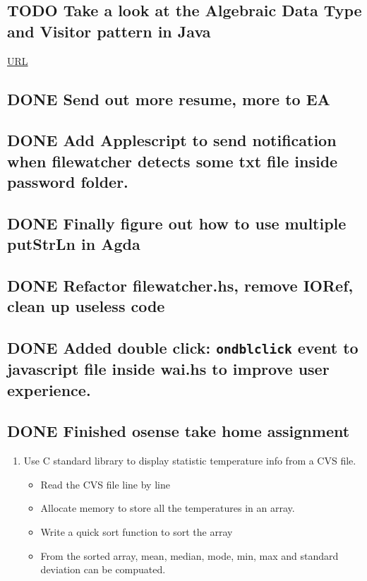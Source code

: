 \documentclass[11pt]{article}
\begin{document}
\subsection{{\bfseries\sffamily TODO} Take a look at the Algebraic Data Type and Visitor pattern in Java}
\label{sec:orgff86d82}
\href{https://www.ahnfelt.net/monads-forget-about-bind/}{URL}
\subsection{{\bfseries\sffamily DONE} Send out more resume,  more to EA}
\label{sec:org56aba22}





\subsection{{\bfseries\sffamily DONE} Add Applescript to send notification when filewatcher detects some txt file inside password folder.}
\label{sec:org25a4dff}
\subsection{{\bfseries\sffamily DONE} Finally figure out how to use multiple putStrLn in Agda}
\label{sec:org5621462}

\subsection{{\bfseries\sffamily DONE} Refactor filewatcher.hs, remove IORef, clean up useless code}
\label{sec:org15b4584}
\subsection{{\bfseries\sffamily DONE} Added double click: \texttt{ondblclick} event to javascript file inside wai.hs to improve user experience.}
\label{sec:org84a45ef}
\subsection{{\bfseries\sffamily DONE} Finished osense take home assignment}
\label{sec:org8151c1b}
\begin{enumerate}
\item Use C standard library to display statistic temperature info from a CVS file.
\begin{itemize}
\item Read the CVS file line by line
\item Allocate memory to store all the temperatures in an array.
\item Write a quick sort function to sort the array
\item From the sorted array, mean, median, mode, min, max and standard deviation can be compuated.
\end{itemize}
\end{enumerate}
\end{document}
